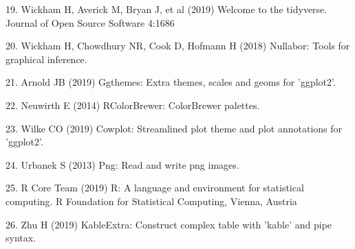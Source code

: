 \documentclass[conference,final,]{IEEEtran}
\begin{document}
\leavevmode\hypertarget{ref-tidyverse}{}%
19. Wickham H, Averick M, Bryan J, et al (2019) Welcome to the tidyverse. Journal of Open Source Software 4:1686

\leavevmode\hypertarget{ref-nullabor}{}%
20. Wickham H, Chowdhury NR, Cook D, Hofmann H (2018) Nullabor: Tools for graphical inference.

\leavevmode\hypertarget{ref-ggthemes}{}%
21. Arnold JB (2019) Ggthemes: Extra themes, scales and geoms for 'ggplot2'.

\leavevmode\hypertarget{ref-RColorBrewer}{}%
22. Neuwirth E (2014) RColorBrewer: ColorBrewer palettes.

\leavevmode\hypertarget{ref-cowplot}{}%
23. Wilke CO (2019) Cowplot: Streamlined plot theme and plot annotations for 'ggplot2'.

\leavevmode\hypertarget{ref-png}{}%
24. Urbanek S (2013) Png: Read and write png images.

\leavevmode\hypertarget{ref-grid}{}%
25. R Core Team (2019) R: A language and environment for statistical computing. R Foundation for Statistical Computing, Vienna, Austria

\leavevmode\hypertarget{ref-kableExtra}{}%
26. Zhu H (2019) KableExtra: Construct complex table with 'kable' and pipe syntax.
\end{document}
